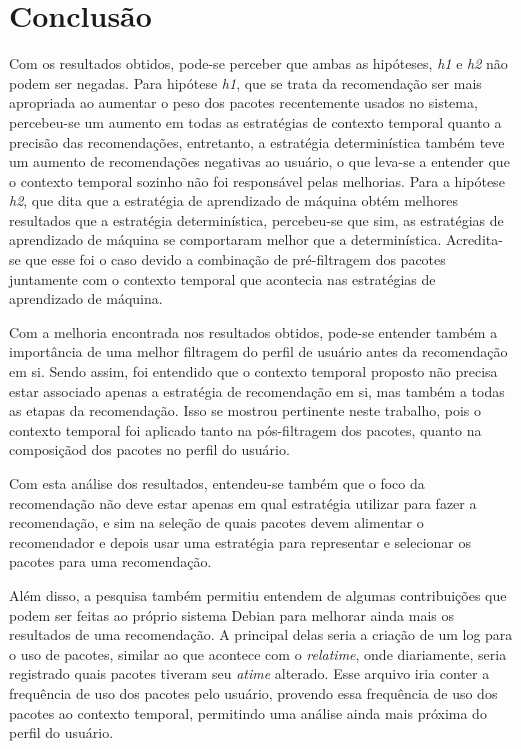 \chapter[Conclusão]{Conclusão}

Com os resultados obtidos, pode-se perceber que ambas as hipóteses, \textit{h1}
e \textit{h2} não podem ser negadas. Para hipótese
\textit{h1}, que se trata da recomendação ser mais apropriada ao aumentar o
peso dos pacotes recentemente usados no sistema, percebeu-se um aumento em todas
as estratégias de contexto temporal quanto a precisão das recomendações,
entretanto, a estratégia determinística também teve um aumento de recomendações
negativas ao usuário, o que leva-se a entender que o contexto temporal sozinho
não foi responsável pelas melhorias. Para a hipótese \textit{h2}, que dita que
a estratégia de aprendizado de máquina obtém melhores resultados que a estratégia
determinística, percebeu-se que sim, as estratégias de aprendizado de máquina se
comportaram melhor que a determinística. Acredita-se que esse foi
o caso devido a combinação de pré-filtragem dos pacotes juntamente com o contexto
temporal que acontecia nas estratégias de aprendizado de máquina.

Com a melhoria encontrada nos resultados obtidos, pode-se entender também a
importância de uma melhor filtragem do perfil de usuário antes da recomendação
em si. Sendo assim, foi entendido que o contexto temporal proposto não precisa
estar associado apenas a estratégia de recomendação em si, mas também a todas as
etapas da recomendação. Isso se mostrou pertinente neste trabalho, pois o
contexto temporal foi aplicado tanto na pós-filtragem dos pacotes, quanto na
composiçãod dos pacotes no perfil do usuário.

Com esta análise dos resultados, entendeu-se também que o foco da
recomendação não deve estar apenas em qual estratégia utilizar para fazer a
recomendação, e sim na seleção de quais pacotes devem alimentar o recomendador e
depois usar uma estratégia para representar e selecionar os pacotes para uma
recomendação.

Além disso, a pesquisa também permitiu entendem de algumas
contribuições que podem ser feitas ao próprio sistema Debian para melhorar ainda
mais os resultados de uma recomendação. A principal delas seria a criação de um log para o uso de
pacotes, similar ao que acontece com o \textit{relatime}, onde diariamente, seria registrado
quais pacotes tiveram seu \textit{atime} alterado. Esse arquivo iria conter a frequência
de uso dos pacotes pelo usuário, provendo essa frequência de uso dos pacotes ao
contexto temporal, permitindo uma análise ainda mais próxima do perfil do usuário.

